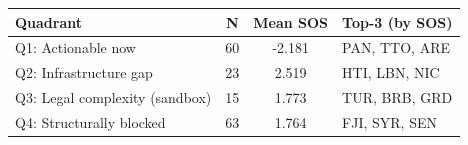 \begin{tabular}{lccl}
\toprule
Quadrant & N & Mean SOS & Top-3 (by SOS) \\
\midrule
Q1: Actionable now & 60 & -2.181 & PAN, TTO, ARE \\
Q2: Infrastructure gap & 23 & 2.519 & HTI, LBN, NIC \\
Q3: Legal complexity (sandbox) & 15 & 1.773 & TUR, BRB, GRD \\
Q4: Structurally blocked & 63 & 1.764 & FJI, SYR, SEN \\
\bottomrule
\end{tabular}
